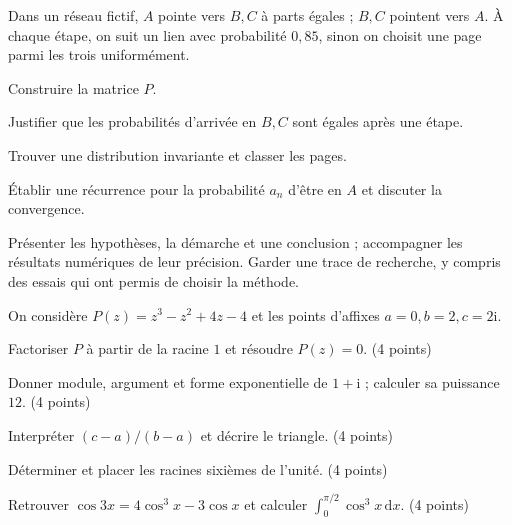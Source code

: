 \label{projet-9}
Dans un réseau fictif, $A$ pointe vers $B,C$ à parts égales ; $B,C$ pointent vers $A$. À chaque étape, on suit un lien avec probabilité $0{,}85$, sinon on choisit une page parmi les trois uniformément.
\begin{questions}
\item Construire la matrice $P$.
\item Justifier que les probabilités d’arrivée en $B,C$ sont égales après une étape.
\item Trouver une distribution invariante et classer les pages.
\item Établir une récurrence pour la probabilité $a_n$ d’être en $A$ et discuter la convergence.
\end{questions}
\vspace{5mm}\noindent Présenter les hypothèses, la démarche et une conclusion ; accompagner les résultats numériques de leur précision. Garder une trace de recherche, y compris des essais qui ont permis de choisir la méthode.\par\vfill{}\par\vspace{2mm}\noindent{}
\label{evaluation-1}
On considère $P(z)=z^3-z^2+4z-4$ et les points d’affixes $a=0,b=2,c=2\mathrm i$.
\begin{questions}
\item Factoriser $P$ à partir de la racine $1$ et résoudre $P(z)=0$. \hfill(4 points)
\item Donner module, argument et forme exponentielle de $1+\mathrm i$ ; calculer sa puissance $12$. \hfill(4 points)
\item Interpréter $(c-a)/(b-a)$ et décrire le triangle. \hfill(4 points)
\item Déterminer et placer les racines sixièmes de l’unité. \hfill(4 points)
\item Retrouver $\cos3x=4\cos^3x-3\cos x$ et calculer $\int_0^{\pi/2}\cos^3x\,\mathrm dx$. \hfill(4 points)
\end{questions}
